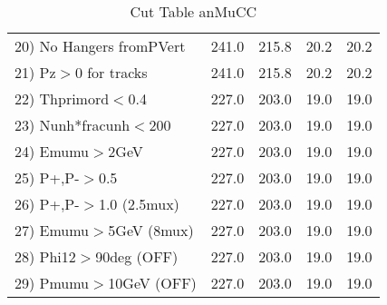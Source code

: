 \begin{table}[h!]
\begin{tabular}{||l||r|r|r|r||}
 20) No Hangers fromPVert &       241.0 &       215.8 &        20.2 &        20.2 \\
 21) Pz$>$0 for tracks    &       241.0 &       215.8 &        20.2 &        20.2 \\
 22) Thprimord$<$0.4      &       227.0 &       203.0 &        19.0 &        19.0 \\
 23) Nunh*fracunh$<$200   &       227.0 &       203.0 &        19.0 &        19.0 \\
 24) Emumu$>$2GeV         &       227.0 &       203.0 &        19.0 &        19.0 \\
 25) P+,P-$>$0.5          &       227.0 &       203.0 &        19.0 &        19.0 \\
 26) P+,P-$>$1.0 (2.5mux) &       227.0 &       203.0 &        19.0 &        19.0 \\
 27) Emumu$>$5GeV  (8mux) &       227.0 &       203.0 &        19.0 &        19.0 \\
 28) Phi12$>$90deg  (OFF) &       227.0 &       203.0 &        19.0 &        19.0 \\
 29) Pmumu$>$10GeV  (OFF) &       227.0 &       203.0 &        19.0 &        19.0 \\
 \hline
 \hline
 \end{tabular}
 \caption{Cut Table  anMuCC }
 \label{tab-cut_anmcc}
 \end{table}
